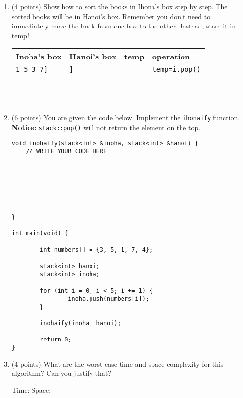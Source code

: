 \documentclass[11pt]{article}
\newcommand{\fillinblank}[1]{\fillinblankmath{\mbox{#1}}}
\newcommand{\fillinblankmath}[1]{\begingroup\setlength{\fboxsep}{1em}\setlength{\fboxrule}{2pt}\fbox{\LARGE\phantom{#1}}\endgroup}
\begin{document}
\begin{enumerate}
\begin{enumerate}
\item (4 points) Show how to sort the books in Ihona's box step by step. The sorted books will be in Hanoi's box. Remember you don't need to immediately move the book from one box to the other. Instead, store it in temp!

\begin{tabular}{l|l|l|l}
Inoha's box      & Hanoi's box & temp   &   operation\\\hline
{\tt 1 5 3 7]} & {\tt ]}     &        &   {\tt temp=i.pop()}\\\hline
&&&\\\hline
&&&\\\hline
&&&\\\hline
&&&\\\hline
&&&\\\hline
&&&\\\hline
&&&\\\hline
&&&\\\hline
&&&\\\hline
&&&\\\hline
\end{tabular}
\newpage
\item (6 points) You are given the code below. Implement the {\tt ihonaify} function. {\bf Notice:} {\tt stack::pop()} will not return the element on the top.

\begin{lstlisting}
void inohaify(stack<int> &inoha, stack<int> &hanoi) {
	// WRITE YOUR CODE HERE
    
    
    
    
    
    
    
}

int main(void) {

        int numbers[] = {3, 5, 1, 7, 4};

        stack<int> hanoi;
        stack<int> inoha;

        for (int i = 0; i < 5; i += 1) {
                inoha.push(numbers[i]);
        }

        inohaify(inoha, hanoi);

        return 0;
}
\end{lstlisting}

\item (4 points) What are the worst case time and space complexity for this algorithm? Can you justify that?

Time: \fillinblank{MMMMM} Space: \fillinblank{MMMMM}
\vspace{2in}
\newpage


\end{enumerate}
\end{enumerate}
\end{document}
